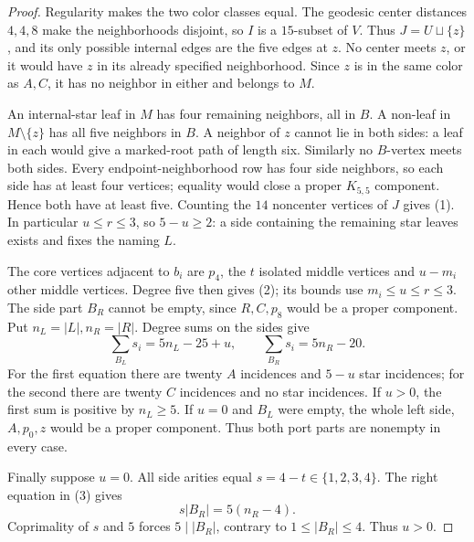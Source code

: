 \documentclass[11pt]{article}
\begin{document}
\begin{proof}
Regularity makes the two color classes equal. The geodesic center
distances $4,4,8$ make the neighborhoods disjoint, so $I$ is a
$15$-subset of $V$. Thus $J=U\sqcup\{z\}$, and its only possible
internal edges are the five edges at $z$. No center meets $z$, or
it would have $z$ in its already specified neighborhood. Since
$z$ is in the same color as $A,C$, it has no neighbor in either
and belongs to $M$.

An internal-star leaf in $M$ has four remaining neighbors, all in
$B$. A non-leaf in $M\setminus\{z\}$ has all five neighbors in
$B$. A neighbor of $z$ cannot lie in both sides: a leaf in each
would give a marked-root path of length six. Similarly no $B$-vertex
meets both sides. Every endpoint-neighborhood row has four side
neighbors, so each side has at least four vertices; equality would
close a proper $K_{5,5}$ component. Hence both have at least five.
Counting the $14$ noncenter vertices of $J$ gives (1). In particular
$u\leq r\leq3$, so $5-u\geq2$: a side containing the remaining
star leaves exists and fixes the naming $L$.

The core vertices adjacent to $b_i$ are $p_4$, the $t$ isolated
middle vertices and $u-m_i$ other middle vertices. Degree five
then gives (2); its bounds use $m_i\leq u\leq r\leq3$.
The side part $B_R$ cannot be empty, since $R,C,p_8$ would be a
proper component. Put $n_L=|L|,n_R=|R|$. Degree sums on the sides give
\[
 \sum_{B_L}s_i=5n_L-25+u,\qquad
 \sum_{B_R}s_i=5n_R-20.                             \tag{3}
\]
For the first equation there are twenty $A$ incidences and $5-u$
star incidences; for the second there are twenty $C$ incidences
and no star incidences. If $u>0$, the first sum is positive by
$n_L\geq5$. If $u=0$ and $B_L$ were empty, the whole left side,
$A,p_0,z$ would be a proper component. Thus both port parts are
nonempty in every case.

Finally suppose $u=0$. All side arities equal $s=4-t\in\{1,2,3,4\}$.
The right equation in (3) gives
\[
 s|B_R|=5(n_R-4).
\]
Coprimality of $s$ and $5$ forces $5\mid |B_R|$, contrary to
$1\leq |B_R|\leq4$. Thus $u>0$.
\end{proof}
\end{document}
